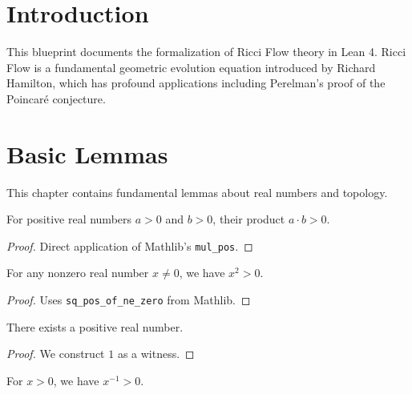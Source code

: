 \chapter{Introduction}

This blueprint documents the formalization of Ricci Flow theory in Lean 4.
Ricci Flow is a fundamental geometric evolution equation introduced by Richard Hamilton,
which has profound applications including Perelman's proof of the Poincaré conjecture.

\chapter{Basic Lemmas}
\label{chap:basic}

This chapter contains fundamental lemmas about real numbers and topology.

\begin{lemma}
\label{lem:pos_mul_pos}
\leanok
For positive real numbers $a > 0$ and $b > 0$, their product $a \cdot b > 0$.
\end{lemma}

\begin{proof}
\leanok
Direct application of Mathlib's \texttt{mul\_pos}.
\end{proof}

\begin{lemma}
\label{lem:square_pos_of_ne_zero}
\leanok
For any nonzero real number $x \neq 0$, we have $x^2 > 0$.
\end{lemma}

\begin{proof}
\leanok
Uses \texttt{sq\_pos\_of\_ne\_zero} from Mathlib.
\end{proof}

\begin{lemma}
\label{lem:exists_pos_real}
\leanok
There exists a positive real number.
\end{lemma}

\begin{proof}
\leanok
We construct $1$ as a witness.
\end{proof}

\begin{lemma}
\label{lem:inv_pos_of_pos}
\leanok
For $x > 0$, we have $x^{-1} > 0$.
\end{lemma}

